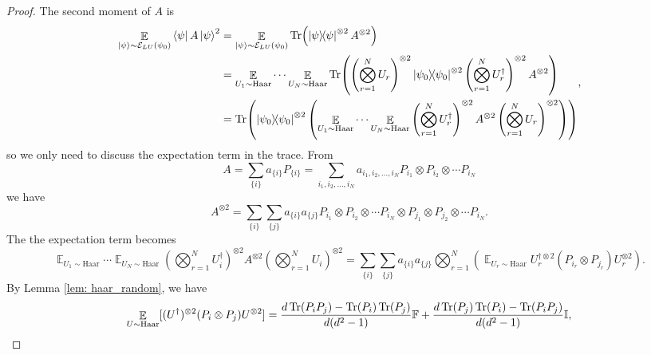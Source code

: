 \documentclass[showpacs,amsmath,amssymb,twocolumn,aps,pra,superscriptaddress,notitlepage,10pt]{revtex4-2}
\newcommand{\bE}{\mathbb E}
\newcommand{\cE}{\mathcal E_{LU}}
\newcommand{\kp}{\ket{\psi}}
\begin{document}
\begin{proof}
    The second moment of $A$ is
    \begin{equation}
        \begin{aligned}\mathop{\bE}_{\kp\sim\cE(\psi_0)}\bra{\psi}A\kp^2&=\mathop{\bE}_{\kp\sim\cE(\psi_0)}\Tr(\ketbra{\psi}{\psi}^{\otimes 2}A^{\otimes 2})\\
        &=\mathop{\bE}_{U_1\sim\mathrm{Haar}}\cdots\mathop{\bE}_{U_N\sim\mathrm{Haar}}\Tr(\left(\bigotimes_{r=1}^NU_r\right)^{\otimes 2}\ketbra{\psi_0}{\psi_0}^{\otimes 2}\left(\bigotimes_{r=1}^NU_r^\dagger\right)^{\otimes 2}A^{\otimes 2})\\
        &=\Tr(\ketbra{\psi_0}{\psi_0}^{\otimes 2}\left(\mathop{\bE}_{U_1\sim\mathrm{Haar}}\cdots\mathop{\bE}_{U_N\sim\mathrm{Haar}}\left(\bigotimes_{r=1}^NU_r^\dagger\right)^{\otimes 2}A^{\otimes 2}\left(\bigotimes_{r=1}^NU_r\right)^{\otimes 2}\right))
        \end{aligned},
    \end{equation}
    so we only need to discuss the expectation term in the trace. From
    \begin{equation}
         A = \sum_{\{i\}}a_{\{i\}}P_{\{i\}}= \sum_{i_1,i_2,\dots,i_N}a_{i_1,i_2,\dots,i_N}P_{i_1}\otimes P_{i_2}\otimes \cdots P_{i_N} \label{equ: paulidecom}
    \end{equation}
    we have
    \begin{equation}
        A^{\otimes 2} = \sum_{\{i\}}\sum_{\{j\}}a_{\{i\}}a_{\{j\}}P_{i_1}\otimes P_{i_2} \otimes\cdots P_{i_N}\otimes P_{j_1}\otimes P_{j_2}\otimes\cdots P_{i_N}.
    \end{equation}
    The the expectation term becomes
    \begin{equation}
        \mathop{\bE}_{U_1\sim\mathrm{Haar}}\cdots\mathop{\bE}_{U_N\sim\mathrm{Haar}}\left(\bigotimes_{r=1}^NU_i^\dagger\right)^{\otimes 2}A^{\otimes 2}\left(\bigotimes_{r=1}^NU_i\right)^{\otimes 2}=\sum_{\{i\}}\sum_{\{j\}}a_{\{i\}}a_{\{j\}}\bigotimes_{r=1}^{N}\left(\mathop{\bE}_{U_r\sim \mathrm{Haar}}U_r^{\dagger\otimes 2}(P_{i_r}\otimes P_{j_r})U_r^{\otimes 2}\right).
    \end{equation}
    By Lemma \ref{lem: haar_random}, we have
    \begin{align}
        \mathop{\bE}_{U\sim\mathrm{Haar}}[(U^\dagger)^{\otimes 2}(P_i\otimes P_j)U^{\otimes 2}]=\frac{d\Tr(P_iP_j)-\Tr(P_i)\Tr(P_j)}{d(d^2-1)}\mathbb F + \frac{d\Tr(P_j)\Tr(P_i)-\Tr(P_iP_j)}{d(d^2-1)}\mathbb I\label{equ: 2design},
    \end{align}

\end{proof}
\end{document}
